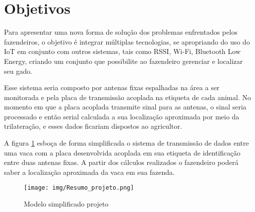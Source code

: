 \newpage
\section{Objetivos}
\label{sc:objetivos_}


{
Para apresentar uma nova forma de solução dos problemas enfrentados pelos fazendeiros, o objetivo é integrar múltiplas tecnologias, se apropriando do uso do IoT em conjunto com outros sistemas, tais como RSSI, Wi-Fi, Bluetooth Low Energy, criando um conjunto que possibilite ao fazendeiro gerenciar e localizar seu gado.
}

{
Esse sistema seria composto por antenas fixas espalhadas na área a ser monitorada e pela placa de transmissão acoplada na etiqueta de cada animal. No momento em que a placa acoplada transmite sinal para as antenas, o sinal seria processado e então serial calculada a sua localização aproximada por meio da trilateração, e esses dados ficariam dispostos ao agricultor.
}

{
A figura \ref{fig:modelo_simplificado_projeto} esboça de forma simplificada o sistema de transmissão de dados entre uma vaca com a placa desenvolvida acoplada em sua etiqueta de identificação entre duas antenas fixas. A partir dos cálculos realizados o fazendeiro poderá saber a localização aproximada da vaca em sua fazenda.
}

\begin{figure}[htp]
    \centering
    \texttt{[image: img/Resumo\_projeto.png]}
    \caption{Modelo simplificado projeto}
    \label{fig:modelo_simplificado_projeto}
\end{figure}


